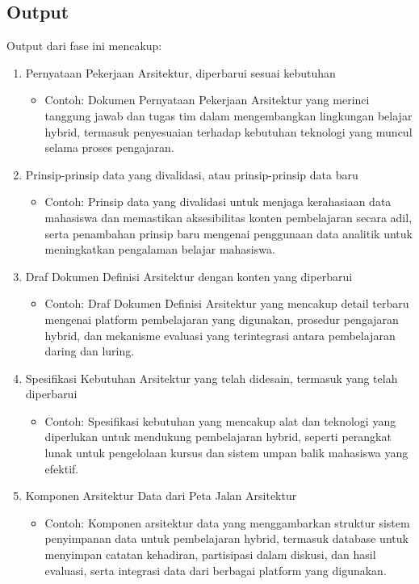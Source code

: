 \subsection{Output}
Output dari fase ini mencakup:
\begin{enumerate}
	\item Pernyataan Pekerjaan Arsitektur, diperbarui sesuai kebutuhan
	\begin{itemize}
		\item Contoh: Dokumen Pernyataan Pekerjaan Arsitektur yang merinci tanggung jawab dan tugas tim dalam mengembangkan lingkungan belajar hybrid, termasuk penyesuaian terhadap kebutuhan teknologi yang muncul selama proses pengajaran.
	\end{itemize}
	\item Prinsip-prinsip data yang divalidasi, atau prinsip-prinsip data baru
	\begin{itemize}
		\item Contoh: Prinsip data yang divalidasi untuk menjaga kerahasiaan data mahasiswa dan memastikan aksesibilitas konten pembelajaran secara adil, serta penambahan prinsip baru mengenai penggunaan data analitik untuk meningkatkan pengalaman belajar mahasiswa.
	\end{itemize}
	\item Draf Dokumen Definisi Arsitektur dengan konten yang diperbarui
	\begin{itemize}
		\item Contoh: Draf Dokumen Definisi Arsitektur yang mencakup detail terbaru mengenai platform pembelajaran yang digunakan, prosedur pengajaran hybrid, dan mekanisme evaluasi yang terintegrasi antara pembelajaran daring dan luring.
	\end{itemize}
	\item Spesifikasi Kebutuhan Arsitektur yang telah didesain, termasuk yang telah diperbarui
	\begin{itemize}
		\item Contoh: Spesifikasi kebutuhan yang mencakup alat dan teknologi yang diperlukan untuk mendukung pembelajaran hybrid, seperti perangkat lunak untuk pengelolaan kursus dan sistem umpan balik mahasiswa yang efektif.
	\end{itemize}
	\item Komponen Arsitektur Data dari Peta Jalan Arsitektur
	\begin{itemize}
		\item Contoh: Komponen arsitektur data yang menggambarkan struktur sistem penyimpanan data untuk pembelajaran hybrid, termasuk database untuk menyimpan catatan kehadiran, partisipasi dalam diskusi, dan hasil evaluasi, serta integrasi data dari berbagai platform yang digunakan.
	\end{itemize}
\end{enumerate}

